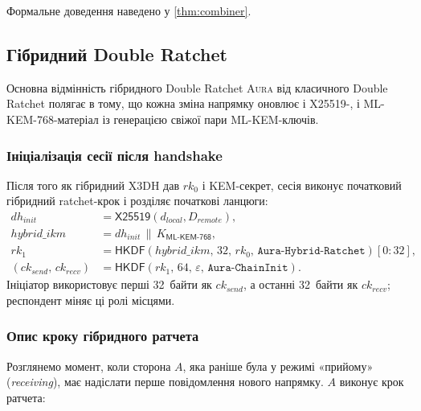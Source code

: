 \documentclass[11pt,a4paper]{article}
\theoremstyle{definition}
\newcommand{\HKDF}{\textsf{HKDF}}
\renewcommand{\DH}{\textsf{X25519}}
\newcommand{\KEM}{\textsf{ML-KEM-768}}
\newcommand{\concat}{\ensuremath{\,\|\,}}
\newcommand{\rk}{\ensuremath{\mathit{rk}}}
\newcommand{\ck}{\ensuremath{\mathit{ck}}}
\newcommand{\Aura}{\mbox{\normalfont\scshape Aura}}
\begin{document}
Формальне доведення наведено у \cref{thm:combiner}.

\subsection{Гібридний Double Ratchet}\label{sec:ratchet}

Основна відмінність гібридного Double Ratchet \Aura{} від класичного
Double Ratchet полягає в тому, що кожна зміна напрямку оновлює і
\DH{}-, і \KEM{}-матеріал із генерацією свіжої пари ML-KEM-ключів.

\subsubsection{Ініціалізація сесії після handshake}

Після того як гібридний X3DH дав $\rk_0$ і KEM-секрет, сесія виконує
початковий гібридний ratchet-крок і розділяє початкові ланцюги:
\begin{align}
  \mathit{dh}_{\mathit{init}}
    &= \DH(d_{\mathit{local}}, D_{\mathit{remote}}), \label{eq:init-dh-ua}\\
  \mathit{hybrid\_ikm}
    &= \mathit{dh}_{\mathit{init}} \concat K_{\KEM}, \label{eq:init-hybrid-ikm-ua}\\
  \rk_1
    &= \HKDF(\mathit{hybrid\_ikm},\,32,\,\rk_0,\,
      \texttt{Aura-Hybrid-Ratchet})[0{:}32], \label{eq:init-root-key-ua}\\
  (\ck_{\mathit{send}},\,\ck_{\mathit{recv}})
    &= \HKDF(\rk_1,\,64,\,\varepsilon,\,
      \texttt{Aura-ChainInit}). \label{eq:init-chain-keys-ua}
\end{align}
Ініціатор використовує перші 32~байти як $\ck_{\mathit{send}}$, а
останні 32~байти як $\ck_{\mathit{recv}}$; респондент міняє ці ролі
місцями.

\subsubsection{Опис кроку гібридного ратчета}\label{sec:ratchet-step}

Розглянемо момент, коли сторона $A$, яка раніше була у режимі
«прийому» (\emph{receiving}), має надіслати перше повідомлення нового
напрямку. $A$ виконує крок ратчета:
\end{document}
